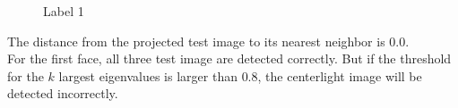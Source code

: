 \documentclass[letterpaper]{polythesis}
\begin{document}
\begin{figure}[H]
  \centering
\caption{Label 1}
  \label{fig:result 1} %
\end{figure}

The distance from the projected test image to its nearest neighbor
is $0.0$.\\

For the first face, all three test image are detected correctly. But if the threshold
for the $k$ largest eigenvalues is larger than $0.8$, the centerlight image will
be detected incorrectly.
\end{document}
